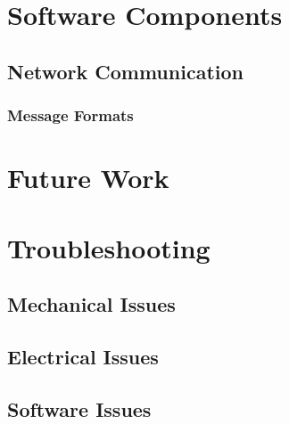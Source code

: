 \documentclass[letterpaper,12pt]{report}
\begin{document}
\chapter{Software Components}
\label{cha:soft-comp}

\section{Network Communication}
\label{sec:network-comm}

\subsection{Message Formats}
\label{sec:message}

\chapter{Future Work}
\label{cha:future-work}

\chapter{Troubleshooting}
\label{cha:troubleshooting}

\section{Mechanical Issues}
\label{sec:mech-issues}

\section{Electrical Issues}
\label{sec:elec-issues}

\section{Software Issues}
\label{sec:soft-issues}
\end{document}
